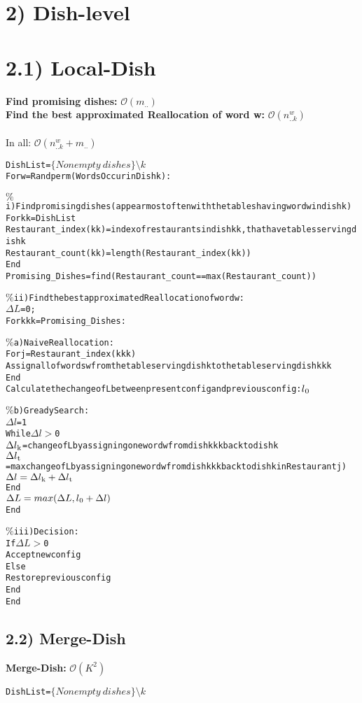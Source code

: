 \documentclass{article}
\begin{document}
\begin{spacing}{1.1}
\section{2) Dish-level}
\section{2.1) Local-Dish}
{\bf Find promising dishes:} $\mathcal{O}(m_{..})$\\
{\bf Find the best approximated Reallocation of word w:} $\mathcal{O}(n_{..k}^{w})$\\ \\
In all: $\mathcal{O}(n_{..k}^{w}+m_{..})$
\begin{alltt}
Dish List=\(\{Nonempty \ dishes\}\setminus k\)
For w=Randperm(Words Occur in Dish k):
    
    \(\%\)i) Find promising dishes(appear most often with the tables having word w in dish k)
    For kk=Dish List
        Restaurant_index(kk)=index of restaurants in dish kk, that have tables serving dish k       
        Restaurant_count(kk)=length(Restaurant_index(kk))
    End 
    Promising_Dishes=find(Restaurant_count==max(Restaurant_count))

    \(\%\)ii) Find the best approximated Reallocation of word w:
    \(\Delta L\)=0; 
    For kkk=Promising_Dishes: 
	
         \(\%\)a)Naive Reallocation:	
        For j=Restaurant_index(kkk)
            Assign all of words w from the table serving dish k to the table serving dish kkk
        End
        Calculate the change of L between present config and previous config:\(l\textsubscript{0}\)
	
        \(\%\)b)Gready Search:
        \(\Delta l\)=1
        While \(\Delta l>\)0
              \(\Delta l\textsubscript{k}\)=change of L by assigning one word w from dish kkk back to dish k
              \(\Delta l\textsubscript{t}\)=max change of L by assigning one word w from dish kkk back to dish k in Restaurant j)
              \(\Delta l=\Delta l\textsubscript{k}+\Delta l\textsubscript{t}\)
        End
        \(\Delta L=max(\Delta L,l\textsubscript{0}+\Delta l)\)
    End 

    \(\%\)iii)Decision:
    If \(\Delta L>\)0
        Accept new config
    Else
        Restore previous config
    End 
End 
\end{alltt}

\subsection{2.2) Merge-Dish}
{\bf Merge-Dish:} $\mathcal{O}(K^{2})$\\
\begin{alltt}
Dish List=\(\{Nonempty \ dishes\}\setminus k\)
 

\end{alltt}
\end{spacing}
\end{document}
